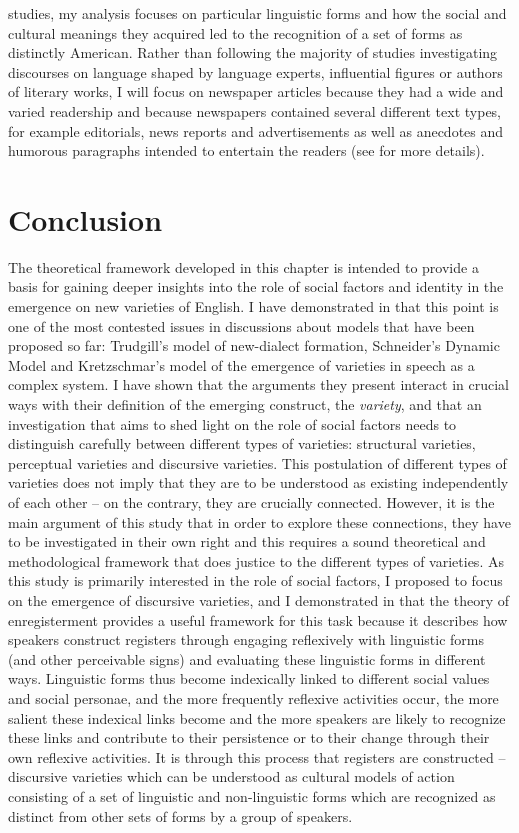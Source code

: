 studies, my analysis focuses on particular linguistic forms and how the social and cultural meanings they acquired led to the recognition of a set of forms as distinctly American. Rather than following the majority of studies investigating discourses on language shaped by language experts, influential figures or authors of literary works, I will focus on newspaper articles because they had a wide and varied readership and because newspapers contained several different text types, for example editorials, news reports and advertisements as well as anecdotes and humorous paragraphs intended to entertain the readers (see  for more details).

\section{Conclusion}
\hypertarget{Toc63021217}{}
The theoretical framework developed in this chapter is intended to provide a basis for gaining deeper insights into the role of social factors and identity in the emergence on new varieties of English. I have demonstrated in  that this point is one of the most contested issues in discussions about models that have been proposed so far: Trudgill’s model of new-dialect formation, Schneider’s Dynamic Model and Kretzschmar’s model of the emergence of varieties in speech as a complex system. I have shown that the arguments they present interact in crucial ways with their definition of the emerging construct, the \textit{variety}, and that an investigation that aims to shed light on the role of social factors needs to distinguish carefully between different types of varieties: structural varieties, perceptual varieties and discursive varieties. This postulation of different types of varieties does not imply that they are to be understood as existing independently of each other – on the contrary, they are crucially connected. However, it is the main argument of this study that in order to explore these connections, they have to be investigated in their own right and this requires a sound theoretical and methodological framework that does justice to the different types of varieties. As this study is primarily interested in the role of social factors, I proposed to focus on the emergence of discursive varieties, and I demonstrated in  that the theory of enregisterment provides a useful framework for this task because it describes how speakers construct registers through engaging reflexively with linguistic forms (and other perceivable signs) and evaluating these linguistic forms in different ways. Linguistic forms thus become indexically linked to different social values and social personae, and the more frequently reflexive activities occur, the more salient these indexical links become and the more speakers are likely to recognize these links and contribute to their persistence or to their change through their own reflexive activities. It is through this process that registers are constructed – discursive varieties which can be understood as cultural models of action consisting of a set of linguistic and non-linguistic forms which are recognized as distinct from other sets of forms by a group of speakers.

